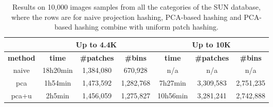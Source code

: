 \begin{table}
\centering
\begin{tabular}{ | c | c | c | c | c | c | c | }
\hline
& \multicolumn{3}{|c|}{Up to 4.4K} & \multicolumn{3}{|c|}{Up to 10K} \\ \hline
\textbf{method} & \textbf{time} & \textbf{\#patches} & \textbf{\#bins} & \textbf{time} & \textbf{\#patches} & \textbf{\#bins}\\
\hline
naive & 18h20min & 1,384,080 & 670,928 & n/a & n/a & n/a \\ \hline
pca & 1h54min & 1,473,592 & 1,282,768 & 7h27min & 3,309,583 & 2,751,235  \\ \hline
pca+u & 2h5min & 1,456,059 & 1,275,827 & 10h56min & 3,281,241 & 2,742,888 \\ \hline
\end{tabular}
\caption{Results on 10,000 images samples from all
the categories of the SUN database, where the rows
are for naive projection hashing, PCA-based hashing and
PCA-based hashing combine with uniform patch hashing.}
\label{tab:nn-res}
\end{table}


